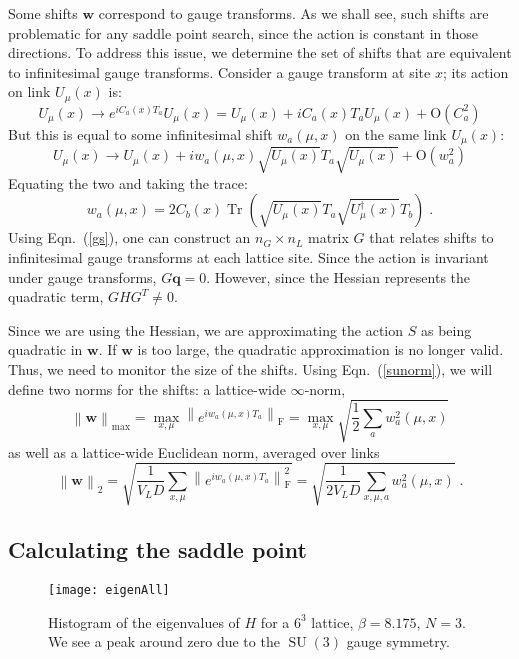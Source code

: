 \documentclass[preprint,aps,prd]{revtex4-2}
\newcommand{\da}{\dagger}  %
\newcommand{\be}{\begin{equation}}
\newcommand{\eq}{\end{equation}}
\DeclareMathOperator{\SU}{SU}
\DeclareMathOperator{\Tr}{Tr}
\newcommand\fnorm[1]{\left\lVert #1 \right\rVert_\mathrm{F}}
\begin{document}
Some shifts $\mathbf{w}$ correspond to gauge transforms.
As we shall see, such shifts are problematic for any saddle
point search, since the action is constant in those directions.
To address this issue, we determine the set of shifts that are
equivalent to infinitesimal gauge transforms.  Consider a gauge transform
at site $x$; its action on link $U_\mu(x)$ is:
\be
U_\mu(x) \to e^{i C_a(x) T_a} U_\mu(x) = U_\mu(x) + i C_a(x) T_a U_\mu(x) +
       \mathrm{O}\!\left(C_a^2\right)
\eq
But this is equal to some infinitesimal shift $w_a(\mu, x)$ on
the same link $U_\mu(x)$:
\be
U_\mu(x) \to U_\mu(x) + i w_a(\mu,x) \sqrt{U_\mu(x)}T_a \sqrt{U_\mu(x)} +
       \mathrm{O}\!\left(w_a^2\right)
\eq
%
Equating the two and taking the trace:
\be
w_a(\mu,x) = 2 C_b(x) \Tr\left(\sqrt{U_\mu(x)} T_a
                     \sqrt{U_\mu^\da(x)} T_b\right) \; . \label{gs}
\eq
Using Eqn.~(\ref{gs}), one can construct an $n_G \times n_L$ matrix
$G$ that relates shifts to infinitesimal gauge transforms
at each lattice site.
Since the action is invariant under gauge transforms, $G \mathbf{q} = 0$.
However, since the Hessian represents the quadratic term, $G H G^T \neq 0$.

Since we are using the Hessian, we are approximating
the action $S$ as being quadratic in $\mathbf{w}$.  If $\mathbf{w}$
is too large, the quadratic approximation is no longer valid.
Thus, we need to monitor the size of the shifts.
Using Eqn.~(\ref{sunorm}), we will define two norms for the shifts:
a lattice-wide $\infty$-norm,
\be
\left\lVert \mathbf{w}\right\rVert_{\mathrm{max}} =
     \max_{x,\mu} \fnorm{e^{i w_{a}(\mu, x) T_a}}
     = \max_{x,\mu} \sqrt{\frac{1}{2}\sum_a w_a^2(\mu, x)}
\eq
as well as a lattice-wide Euclidean norm, averaged over links
\be
\left\lVert \mathbf{w}\right\rVert_2 =
      \sqrt{\frac{1}{V_L D} \sum_{x, \mu}
        \fnorm{e^{i w_{a}(\mu, x) T_a}}^2}
     = \sqrt{\frac{1}{2 V_L D} \sum_{x, \mu, a} w_a^2(\mu, x)}
        \; .  \label{shiftsize}
\eq

\subsection{Calculating the saddle point}
\label{saddle}

\begin{figure}
\texttt{[image: eigenAll]}
\caption{Histogram of the eigenvalues of $H$ for a $6^3$ lattice,
  $\beta = 8.175$, $N=3$.  We see a peak around zero due to the
  $\SU(3)$ gauge symmetry.
  \label{eigenAll}}
\end{figure}
\end{document}

